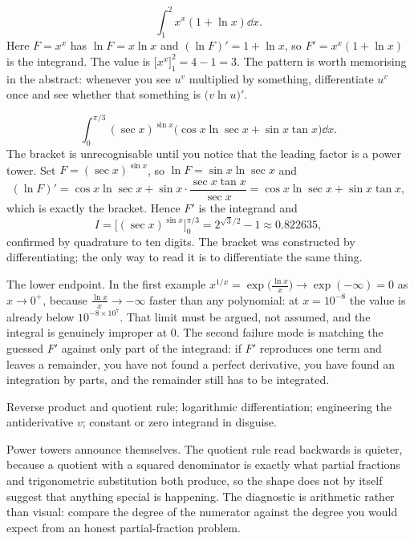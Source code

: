 \begin{worked}
\[\int_1^{2}x^{x}(1+\ln x)\dd x.\]
Here $F=x^{x}$ has $\ln F=x\ln x$ and $(\ln F)'=1+\ln x$, so $F'=x^{x}(1+\ln x)$ is the integrand. The value is $\bigl[x^{x}\bigr]_1^{2}=4-1=3$. The pattern is worth memorising in the abstract: whenever you see $u^{v}$ multiplied by something, differentiate $u^{v}$ once and see whether that something is $\bigl(v\ln u\bigr)'$.
\end{worked}

\begin{worked}
\[\int_0^{\pi/3}(\sec x)^{\sin x}\bigl(\cos x\ln\sec x+\sin x\tan x\bigr)\dd x.\]
The bracket is unrecognisable until you notice that the leading factor is a power tower. Set $F=(\sec x)^{\sin x}$, so $\ln F=\sin x\ln\sec x$ and
\[(\ln F)'=\cos x\ln\sec x+\sin x\cdot\frac{\sec x\tan x}{\sec x}=\cos x\ln\sec x+\sin x\tan x,\]
which is exactly the bracket. Hence $F'$ is the integrand and
\[I=\bigl[(\sec x)^{\sin x}\bigr]_0^{\pi/3}=2^{\sqrt3/2}-1\approx0.822635,\]
confirmed by quadrature to ten digits. The bracket was constructed by differentiating; the only way to read it is to differentiate the same thing.
\end{worked}

\begin{trap}
The lower endpoint. In the first example $x^{1/x}=\exp\bigl(\tfrac{\ln x}{x}\bigr)\to\exp(-\infty)=0$ as $x\to0^{+}$, because $\tfrac{\ln x}{x}\to-\infty$ faster than any polynomial: at $x=10^{-8}$ the value is already below $10^{-8\times10^{7}}$. That limit must be argued, not assumed, and the integral is genuinely improper at $0$. The second failure mode is matching the guessed $F'$ against only part of the integrand: if $F'$ reproduces one term and leaves a remainder, you have not found a perfect derivative, you have found an integration by parts, and the remainder still has to be integrated.
\end{trap}

\begin{seealsob}Reverse product and quotient rule; logarithmic differentiation; engineering the antiderivative $v$; constant or zero integrand in disguise.\end{seealsob}

Power towers announce themselves. The quotient rule read backwards is quieter, because a quotient with a squared denominator is exactly what partial fractions and trigonometric substitution both produce, so the shape does not by itself suggest that anything special is happening. The diagnostic is arithmetic rather than visual: compare the degree of the numerator against the degree you would expect from an honest partial-fraction problem.

